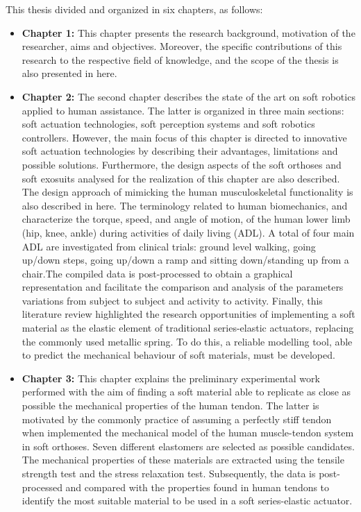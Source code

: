 This thesis divided and organized in six chapters, as follows:
\begin{itemize}
    \item {\bf Chapter 1: } This chapter presents the research background, motivation of the researcher, aims and objectives. Moreover, the specific contributions of this research to the respective field of knowledge, and the scope of the thesis is also presented in here.
    \item {\bf Chapter 2:} The second chapter describes the state of the art on soft robotics applied to human assistance. The latter is organized in three main sections: soft actuation technologies, soft perception systems and soft robotics controllers. However, the main focus of this chapter is directed to innovative soft actuation technologies by describing their advantages, limitations and possible solutions. Furthermore, the design aspects of the soft orthoses and soft exosuits analysed for the realization of this chapter are also described. The design approach of mimicking the human musculoskeletal functionality is also described in here. The terminology related to human biomechanics, and characterize the torque, speed, and angle of motion, of the human lower limb (hip, knee, ankle) during activities of daily living (ADL). A total of four main ADL are investigated from clinical trials: ground level walking, going up/down steps, going up/down a ramp and sitting down/standing up from a chair.The compiled data is post-processed to obtain a graphical representation and facilitate the comparison and analysis of the parameters variations from subject to subject and activity to activity. Finally, this literature review highlighted the research opportunities of implementing a soft material as the elastic element of traditional series-elastic actuators, replacing the commonly used metallic spring. To do this, a reliable modelling tool, able to predict the mechanical behaviour of soft materials, must be developed.
    \item {\bf Chapter 3: } This chapter explains the preliminary experimental work performed with the aim of finding a soft material able to replicate as close as possible the mechanical properties of the human tendon. The latter is motivated by the commonly practice of assuming a perfectly stiff tendon when implemented the mechanical model of the human muscle-tendon system in soft orthoses. Seven different elastomers are selected as possible candidates. The mechanical properties of these materials are extracted using the tensile strength test and the stress relaxation test. Subsequently, the data is post-processed and compared with the properties found in human tendons to identify the most suitable material to be used in a soft series-elastic actuator.

\end{itemize}
